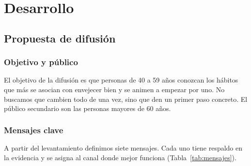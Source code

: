 \documentclass[12pt, letterpaper, table, xcdraw]{extarticle}
\begin{document}

\section{Desarrollo}
\label{sec:desarrollo}

\subsection{Propuesta de difusión}

\subsubsection{Objetivo y público}

El objetivo de la difusión es que personas de 40 a 59 años conozcan los hábitos que más se asocian con envejecer bien y se animen a empezar por uno. No buscamos que cambien todo de una vez, sino que den un primer paso concreto. El público secundario son las personas mayores de 60 años.

\subsubsection{Mensajes clave}

A partir del levantamiento definimos siete mensajes. Cada uno tiene respaldo en la evidencia y se asigna al canal donde mejor funciona (Tabla~\ref{tab:mensajes}).
\end{document}
